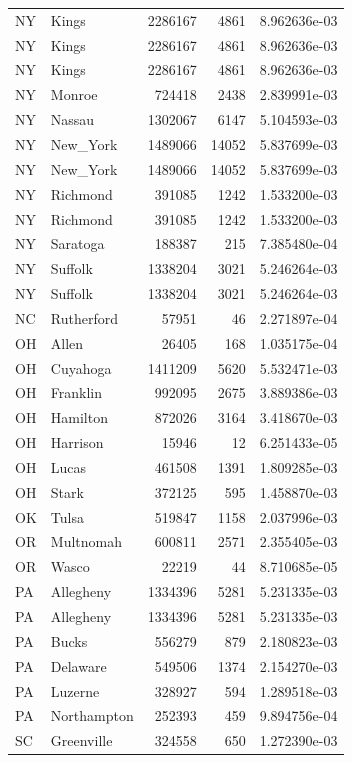 \documentclass[
  letterpaper,
  DIV=11,
  numbers=noendperiod]{scrreprt}
\renewcommand{\[}{\begin{equation}}
\renewcommand{\]}{\end{equation}}
\begin{document}
\begin{table}
\begin{tabular*}{\linewidth}{@{\extracolsep{\fill}}llrrr}
NY & Kings & 2286167 & 4861 & 8.962636e-03 \\ 
NY & Kings & 2286167 & 4861 & 8.962636e-03 \\ 
NY & Kings & 2286167 & 4861 & 8.962636e-03 \\ 
NY & Monroe & 724418 & 2438 & 2.839991e-03 \\ 
NY & Nassau & 1302067 & 6147 & 5.104593e-03 \\ 
NY & New\_York & 1489066 & 14052 & 5.837699e-03 \\ 
NY & New\_York & 1489066 & 14052 & 5.837699e-03 \\ 
NY & Richmond & 391085 & 1242 & 1.533200e-03 \\ 
NY & Richmond & 391085 & 1242 & 1.533200e-03 \\ 
NY & Saratoga & 188387 & 215 & 7.385480e-04 \\ 
NY & Suffolk & 1338204 & 3021 & 5.246264e-03 \\ 
NY & Suffolk & 1338204 & 3021 & 5.246264e-03 \\ 
NC & Rutherford & 57951 & 46 & 2.271897e-04 \\ 
OH & Allen & 26405 & 168 & 1.035175e-04 \\ 
OH & Cuyahoga & 1411209 & 5620 & 5.532471e-03 \\ 
OH & Franklin & 992095 & 2675 & 3.889386e-03 \\ 
OH & Hamilton & 872026 & 3164 & 3.418670e-03 \\ 
OH & Harrison & 15946 & 12 & 6.251433e-05 \\ 
OH & Lucas & 461508 & 1391 & 1.809285e-03 \\ 
OH & Stark & 372125 & 595 & 1.458870e-03 \\ 
OK & Tulsa & 519847 & 1158 & 2.037996e-03 \\ 
OR & Multnomah & 600811 & 2571 & 2.355405e-03 \\ 
OR & Wasco & 22219 & 44 & 8.710685e-05 \\ 
PA & Allegheny & 1334396 & 5281 & 5.231335e-03 \\ 
PA & Allegheny & 1334396 & 5281 & 5.231335e-03 \\ 
PA & Bucks & 556279 & 879 & 2.180823e-03 \\ 
PA & Delaware & 549506 & 1374 & 2.154270e-03 \\ 
PA & Luzerne & 328927 & 594 & 1.289518e-03 \\ 
PA & Northampton & 252393 & 459 & 9.894756e-04 \\ 
SC & Greenville & 324558 & 650 & 1.272390e-03 \\ 

\end{tabular*}
\end{table}
\end{document}
